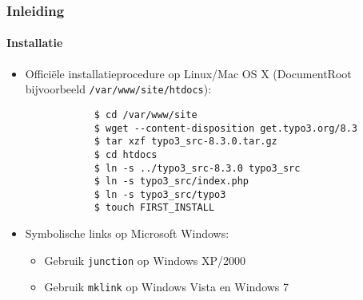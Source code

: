 \begin{frame}[fragile]
	\frametitle{Inleiding}
	\framesubtitle{Installatie}

	\begin{itemize}
		\item Officiële installatieprocedure op Linux/Mac OS X\newline
			(DocumentRoot bijvoorbeeld \texttt{/var/www/site/htdocs}):
		\begin{lstlisting}
			$ cd /var/www/site
			$ wget --content-disposition get.typo3.org/8.3
			$ tar xzf typo3_src-8.3.0.tar.gz
			$ cd htdocs
			$ ln -s ../typo3_src-8.3.0 typo3_src
			$ ln -s typo3_src/index.php
			$ ln -s typo3_src/typo3
			$ touch FIRST_INSTALL
		\end{lstlisting}

		\item Symbolische links op Microsoft Windows:

			\begin{itemize}
				\item Gebruik \texttt{junction} op Windows XP/2000
				\item Gebruik \texttt{mklink} op Windows Vista en Windows 7
			\end{itemize}

	\end{itemize}
\end{frame}

